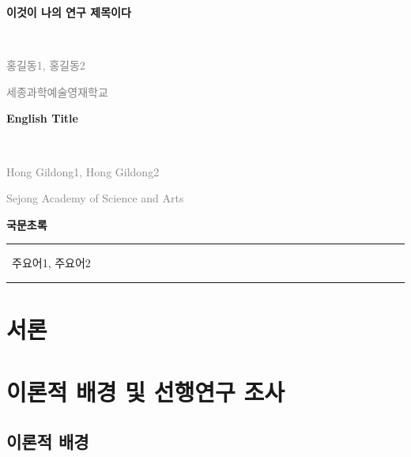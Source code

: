 \documentclass[10pt]{oblivoir}
\def\mytitle{English Title} %
\def\mytitleko{이것이 나의 연구 제목이다}  %
\def\myauthorfirst{Hong Gildong1} %
\def\myauthorsecond{Hong Gildong2} %
\def\myauthorfirstko{홍길동1} %
\def\myauthorsecondko{홍길동2} %
\def\affiliation{Sejong Academy of Science and Arts}
\def\affiliationko{세종과학예술영재학교}
\def\mykeywordsko{주요어1, 주요어2} %
\theoremstyle{definition}
\theoremstyle{remark}
\numberwithin{equation}{section}
\begin{document}

\begin{center}
\begin{spacing}{1.3}
{\LARGE\bfseries    \mytitleko }\par {\ } \par 
\textcolor{gray}{\myauthorfirstko, \myauthorsecondko} \par 
\textcolor{gray}{\small\affiliationko}
\end{spacing}
\vspace{18pt}

{\Large\bfseries    \mytitle }\par {\ } \par 
\textcolor{gray}{\myauthorfirst, \myauthorsecond} \par 
\textcolor{gray}{\small\affiliation}
\end{center}




 \begin{center}{\Large\textbf{국문초록}} \noindent\rule{\textwidth}{.12mm} \end{center}

\vskip5pt
\ \mykeywordsko

\noindent\rule{\textwidth}{.12mm}




\section{서론} %

\jiwon[2] %

\section{이론적 배경 및 선행연구 조사}
\subsection{이론적 배경}
\end{document}
